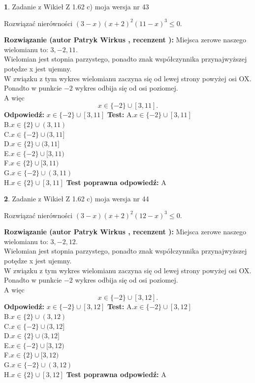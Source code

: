\documentclass[12pt, a4paper]{article}
\theoremstyle{definition} %
\newtheorem{zad}{}
\newcommand{\zadStart}[1]{\begin{zad}#1\newline}
\newcommand{\zadStop}{\end{zad}}
\newcommand{\rozwStart}[2]{\noindent \textbf{Rozwiązanie (autor #1 , recenzent #2): }\newline}
\newcommand{\rozwStop}{\newline}
\newcommand{\odpStart}{\noindent \textbf{Odpowiedź:}\newline}
\newcommand{\odpStop}{\newline}
\newcommand{\testStart}{\noindent \textbf{Test:}\newline}
\newcommand{\testStop}{\newline}
\newcommand{\kluczStart}{\noindent \textbf{Test poprawna odpowiedź:}\newline}
\newcommand{\kluczStop}{\newline}
\begin{document}
\zadStart{Zadanie z Wikieł Z 1.62 c) moja wersja nr 43}

Rozwiązać nierówności $(3-x)(x+2)^{2}(11-x)^{3}\le0$.
\zadStop
\rozwStart{Patryk Wirkus}{}
Miejsca zerowe naszego wielomianu to: $3, -2, 11$.\\
Wielomian jest stopnia parzystego, ponadto znak współczynnika przy\linebreak najwyższej potędze x jest ujemny.\\ W związku z tym wykres wielomianu zaczyna się od lewej strony powyżej osi OX.\\
Ponadto w punkcie $-2$ wykres odbija się od osi poziomej.\\
A więc $$x \in \{-2\} \cup [3,11].$$
\rozwStop
\odpStart
$x \in \{-2\} \cup [3,11]$
\odpStop
\testStart
A.$x \in \{-2\} \cup [3,11]$\\
B.$x \in \{2\} \cup (3,11)$\\
C.$x \in \{-2\} \cup (3,11]$\\
D.$x \in \{2\} \cup (3,11]$\\
E.$x \in \{-2\} \cup [3,11)$\\
F.$x \in \{2\} \cup [3,11)$\\
G.$x \in \{-2\} \cup (3,11)$\\
H.$x \in \{2\} \cup [3,11]$
\testStop
\kluczStart
A
\kluczStop



\zadStart{Zadanie z Wikieł Z 1.62 c) moja wersja nr 44}

Rozwiązać nierówności $(3-x)(x+2)^{2}(12-x)^{3}\le0$.
\zadStop
\rozwStart{Patryk Wirkus}{}
Miejsca zerowe naszego wielomianu to: $3, -2, 12$.\\
Wielomian jest stopnia parzystego, ponadto znak współczynnika przy\linebreak najwyższej potędze x jest ujemny.\\ W związku z tym wykres wielomianu zaczyna się od lewej strony powyżej osi OX.\\
Ponadto w punkcie $-2$ wykres odbija się od osi poziomej.\\
A więc $$x \in \{-2\} \cup [3,12].$$
\rozwStop
\odpStart
$x \in \{-2\} \cup [3,12]$
\odpStop
\testStart
A.$x \in \{-2\} \cup [3,12]$\\
B.$x \in \{2\} \cup (3,12)$\\
C.$x \in \{-2\} \cup (3,12]$\\
D.$x \in \{2\} \cup (3,12]$\\
E.$x \in \{-2\} \cup [3,12)$\\
F.$x \in \{2\} \cup [3,12)$\\
G.$x \in \{-2\} \cup (3,12)$\\
H.$x \in \{2\} \cup [3,12]$
\testStop
\kluczStart
A
\kluczStop
\end{document}
